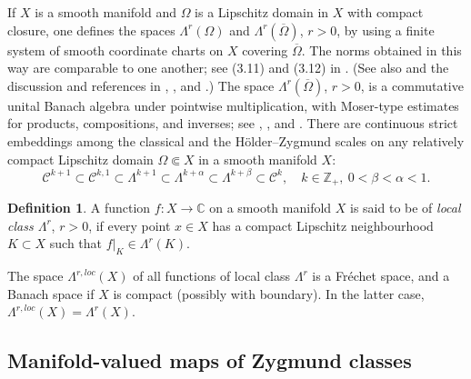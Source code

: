 \documentclass[11pt]{amsart}
\numberwithin{equation}{section}
\theoremstyle{definition}
\newtheorem{definition}[theorem]{Definition}
\newcommand\Cscr{\mathscr{C}}
\newcommand\C{\mathbb{C}}
\newcommand\Z{\mathbb{Z}}
\begin{document}
If $X$ is a smooth manifold and $\Omega$ is a Lipschitz domain in $X$ 
with compact closure, one defines the spaces $\Lambda^{r}(\Omega)$ 
and $\Lambda^{r}(\overline \Omega)$, $r>0$,
by using a finite system of smooth coordinate 
charts on $X$ covering $\overline \Omega$. 
The norms obtained in this way are comparable to one another;
see (3.11) and (3.12) in \cite[Lemma 3.1]{GanGong2024}.
(See also \cite{Palais1968,Palais1971} 
and the discussion and references in 
\cite{BourdaudCristoforis2002}, \cite[Sect.\ 2]{Forstneric2007AJM}, 
and \cite[Subsect.\ 3.2]{GongShi2024}.)
%
The space $\Lambda^r(\overline\Omega)$, $r>0$, 
is a commutative unital Banach algebra 
under pointwise multiplication, with Moser-type estimates for products, 
compositions, and inverses; see \cite[Lemmas 3.1--3.3]{Gong2019MA},
\cite[Lemma 6.3]{Gong2025TAMS}, and \cite{BourdaudCristoforis2002}. 
There are continuous strict embeddings among the 
classical and the H\"older--Zygmund scales on
any relatively compact Lipschitz domain $\Omega\Subset X$
in a smooth manifold $X$:
\begin{equation}\label{eq:scale}
	\Cscr^{k+1}\subset \Cscr^{k,1} \subset \Lambda^{k+1}\subset
	\Lambda^{k+\alpha} \subset 
	\Lambda^{k+\beta}\subset \Cscr^k,\quad 
	k\in\Z_+,\ 0<\beta<\alpha<1.
\end{equation}

\begin{definition}\label{def:local}
A function $f:X\to \C$ on a smooth manifold $X$ 
is said to be of {\em local class $\Lambda^r$}, $r>0$,  
if every point $x\in X$ has a compact Lipschitz neighbourhood
$K \subset X$ such that $f|_K \in \Lambda^r(K)$.
\end{definition}

The space $\Lambda^{r,loc}(X)$ of all functions of local class $\Lambda^r$ 
is a Fr\'echet space, and a Banach space if $X$ is compact 
(possibly with boundary). In the latter case, 
$\Lambda^{r,loc}(X)=\Lambda^{r}(X)$. 

%
%
\subsection{Manifold-valued maps of Zygmund classes}
\label{ss:manifold-valued} 
\end{document}
